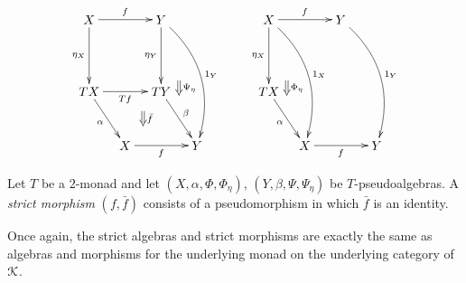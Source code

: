 \begin{Defi}
\begin{itemize}
            \[
                        \xy
            (0,0)*+{X}="00";
            (20,0)*+{Y}="10";
            (0,-20)*+{TX}="01";
            (20,-20)*+{TY}="11";
            (10,-35)*+{X}="02";
            (30,-35)*+{Y}="12";
            {\ar^{f} "00" ; "10"};
            {\ar@/^1.5pc/^{1_Y} "10" ; "12"};
            {\ar_{\eta_X} "00" ; "01"};
            {\ar_{\eta_Y} "10" ; "11"};
            {\ar_{Tf} "01" ; "11"};
            {\ar_{\alpha} "01" ; "02"};
            {\ar_{f} "02" ; "12"};
            {\ar^{\beta} "11" ; "12"};
            {\ar@{=>}^{\bar{f}} (15,-25.5) ; (15,-29.5)};
            {\ar@{=>}^{\Psi_{\eta}} (25,-17) ; (25,-21)};
            (50,0)*+{X}="30";
            (70,0)*+{Y}="40";
            (50,-20)*+{TX}="31";
            (60,-35)*+{X}="32";
            (80,-35)*+{Y}="42";
            {\ar^{f} "30" ; "40"};
            {\ar_{\eta_X} "30" ; "31"};
            {\ar_{\alpha} "31" ; "32"};
            {\ar_{f} "32" ; "42"};
            {\ar@/^1.5pc/^{1_X} "30" ; "32"};
            {\ar@/^1.5pc/^{1_Y} "40" ; "42"};
            {\ar@{=>}^{\Phi_{\eta}} (55,-17) ; (55,-21)};
        \endxy
        \]

\end{itemize}
\end{Defi}

\begin{Defi}
Let $T$ be a $2$-monad and let $(X,\alpha,\Phi,\Phi_\eta)$, $(Y,\beta,\Psi,\Psi_\eta)$ be $T$-pseudoalgebras. A \textit{strict morphism} $(f, \bar{f})$ consists of a pseudomorphism in which $\bar{f}$ is an identity.
\end{Defi}

\begin{rem}
Once again, the strict algebras and strict morphisms are exactly the same as algebras and morphisms for the underlying monad on the underlying category of $\mathcal{K}$.
\end{rem}

